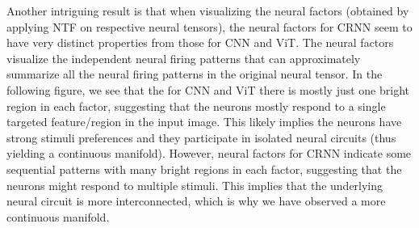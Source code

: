 Another intriguing result is that when visualizing the neural factors (obtained by applying NTF on respective neural tensors), the neural factors for CRNN seem to have very distinct properties from those for CNN and ViT. The neural factors visualize the independent neural firing patterns that can approximately summarize all the neural firing patterns in the original neural tensor. In the following figure, we see that the for CNN and ViT there is mostly just one bright region in each factor, suggesting that the neurons mostly respond to a single targeted feature/region in the input image. This likely implies the neurons have strong stimuli preferences and they participate in isolated neural circuits (thus yielding a continuous manifold). However, neural factors for CRNN indicate some sequential patterns with many bright regions in each factor, suggesting that the neurons might respond to multiple stimuli. This implies that the underlying neural circuit is more interconnected, which is why we have observed a more continuous manifold.
